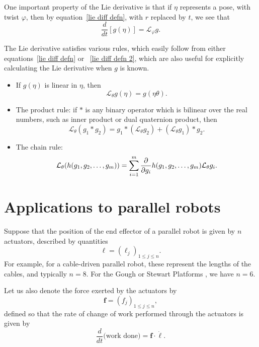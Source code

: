 \documentclass[reqno,12pt]{amsart}
\newcommand{\liederiv}{\mathcal L}
\begin{document}
One important property of the Lie derivative is that if $\eta$ represents a pose, with twist $\varphi$, then by equation~\eqref{lie diff defn}, with $r$ replaced by $t$, we see that
\begin{equation}
\label{dot f Lie phi}
\frac d{dt} [g(\eta)] = \liederiv_\varphi g .
\end{equation}

The Lie derivative satisfies various rules, which easily follow from either equations~\eqref{lie diff defn} or ~\eqref{lie diff defn 2}, which are also useful for explicitly calculating the Lie derivative when $g$ is known.
\begin{itemize}
\item If $g(\eta)$ is linear in $\eta$, then
\begin{equation}
\label{rule linear}
\liederiv_\theta g(\eta) = g(\eta \theta).
\end{equation}
\item The product rule: if $*$ is any binary operator which is bilinear over the real numbers, such as inner product or dual quaternion product, then
\begin{equation}
\liederiv_\theta (g_1 * g_2) = g_1 * (\liederiv_\theta g_2) + (\liederiv_\theta g_1) * g_2.
\end{equation}
\item The chain rule:
\begin{equation}
\liederiv_\theta (h(g_1, g_2,\dots,g_m)) \\ = \sum_{i=1}^m
\frac\partial{\partial g_i} h(g_1, g_2,\dots,g_m) \liederiv_\theta g_i .
\end{equation}
\end{itemize}

\section{Applications to parallel robots}

Suppose that the position of the end effector of a parallel robot is given by $n$ actuators, described by quantities
\begin{equation}
\bm \ell = (\ell_j)_{1 \le j \le n} .
\end{equation}
For example, for a cable-driven parallel robot, these represent the lengths of the cables, and typically $n = 8$.  For the Gough or Stewart Platforms \cite{gallardo-alvarado}, we have $n = 6$.

Let us also denote the force exerted by the actuators by 
\begin{equation}
\bm f = (f_j)_{1 \le j \le n} ,
\end{equation}
defined so that the rate of change of work performed through the actuators is given by
\begin{equation}
\label{dot h f ell}
\frac{d}{dt} \text{(work done)} = \bm f \cdot \dot{\bm\ell} .
\end{equation}
\end{document}
